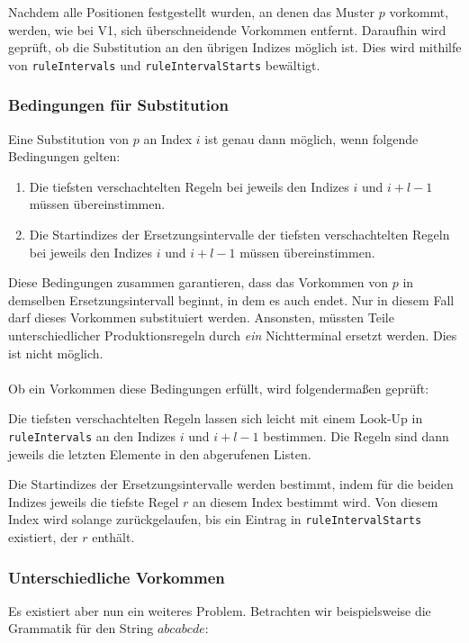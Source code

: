 Nachdem alle Positionen festgestellt wurden, an denen das Muster $p$ vorkommt, werden, wie bei V1, sich überschneidende Vorkommen entfernt. Daraufhin wird geprüft, ob die Substitution an den übrigen Indizes möglich ist. Dies wird mithilfe von \texttt{ruleIntervals} und \texttt{ruleIntervalStarts} bewältigt.

\subsubsection{Bedingungen für Substitution} Eine Substitution von $p$ an Index $i$ ist genau dann möglich, wenn folgende Bedingungen gelten:

\begin{enumerate}
	\item Die tiefsten verschachtelten Regeln bei jeweils den Indizes $i$ und $i + l - 1$ müssen übereinstimmen.
	\item Die Startindizes der Ersetzungsintervalle der tiefsten verschachtelten Regeln bei jeweils den Indizes $i$ und $i + l - 1$ müssen übereinstimmen. 
\end{enumerate}

Diese Bedingungen zusammen garantieren, dass das Vorkommen von $p$ in demselben Ersetzungsintervall beginnt, in dem es auch endet. Nur in diesem Fall darf dieses Vorkommen substituiert werden. Ansonsten, müssten Teile unterschiedlicher Produktionsregeln durch \emph{ein} Nichtterminal ersetzt werden. Dies ist nicht möglich.\\\\
Ob ein Vorkommen diese Bedingungen erfüllt, wird folgendermaßen geprüft:

Die tiefsten verschachtelten Regeln lassen sich leicht mit einem Look-Up in \texttt{ruleIntervals} an den Indizes $i$ und $i + l - 1$ bestimmen. Die Regeln sind dann jeweils die letzten Elemente in den abgerufenen Listen.

Die Startindizes der Ersetzungsintervalle werden bestimmt, indem für die beiden Indizes jeweils die tiefste Regel $r$ an diesem Index bestimmt wird. Von diesem Index wird solange zurückgelaufen, bis ein Eintrag in \texttt{ruleIntervalStarts} existiert, der $r$ enthält.

\subsubsection{Unterschiedliche Vorkommen}

Es existiert aber nun ein weiteres Problem. Betrachten wir beispielsweise die Grammatik für den String $abcabcde$:

